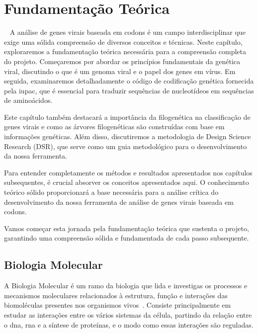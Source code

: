 
\setlength{\parskip}{0.3cm}

\chapter{Fundamentação Teórica}~\label{ch:fundamentacao}
A análise de genes virais baseada em codons é um campo interdisciplinar que exige uma sólida compreensão de diversos conceitos e técnicas. Neste capítulo, exploraremos a fundamentação teórica necessária para a compreensão completa do projeto. Começaremos por abordar os princípios fundamentais da genética viral, discutindo o que é um genoma viral e o papel dos genes em vírus. Em seguida, examinaremos detalhadamente o código de codificação genética fornecida pela \gls{iupac}, que é essencial para traduzir sequências de nucleotídeos em sequências de aminoácidos.

Este capítulo também destacará a importância da filogenética na classificação de genes virais e como as árvores filogenéticas são construídas com base em informações genéticas. Além disso, discutiremos a metodologia de Design Science Research (DSR), que serve como um guia metodológico para o desenvolvimento da nossa ferramenta.

Para entender completamente os métodos e resultados apresentados nos capítulos subsequentes, é crucial absorver os conceitos apresentados aqui. O conhecimento teórico sólido proporcionará a base necessária para a análise crítica do desenvolvimento da nossa ferramenta de análise de genes virais baseada em codons.

Vamos começar esta jornada pela fundamentação teórica que sustenta o projeto, garantindo uma compreensão sólida e fundamentada de cada passo subsequente.

\section{Biologia Molecular}
A Biologia Molecular é um ramo da biologia que lida e investigas os processos e mecanismos moleculares relacionados à estrutura, função e interações das biomoléculas presentes nos organismos vivos~\cite{alberts_biologia_2017}. Consiste principalmente em estudar as interações entre os vários sistemas da célula, partindo da relação entre o \gls{dna}, \gls{rna} e a síntese de proteínas, e o modo como essas interações são reguladas.

